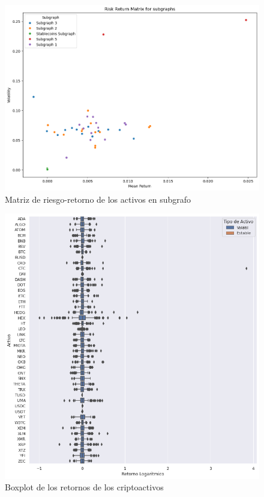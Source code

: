 \documentclass[runningheads,legalpaper,10pt]{etc/llncs}
\begin{document}
\begin{figure}[htp]
    \includegraphics[scale=0.6]{images/risk_matrix_subgraphs.png}
    \caption{Matriz de riesgo-retorno de los activos en subgrafo}
    \label{fig:risk_matrix_subgraph}
\end{figure}

\begin{figure}[htp]
    \includegraphics[scale=0.6]{images/box_returns.png}
    \caption{Boxplot de los retornos de los criptoactivos}
    \label{fig:box_returns}
\end{figure}
\end{document}
